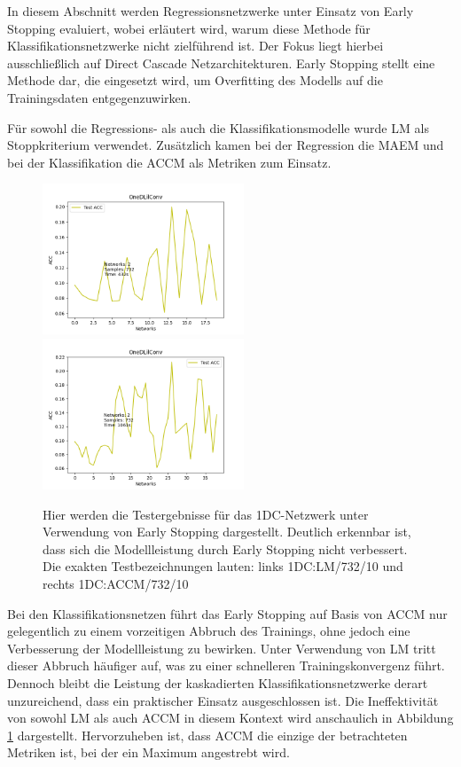 In diesem Abschnitt werden Regressionsnetzwerke unter Einsatz von Early Stopping evaluiert, wobei erläutert wird, warum diese Methode für 
Klassifikationsnetzwerke nicht zielführend ist. Der Fokus liegt hierbei ausschließlich auf Direct Cascade Netzarchitekturen. 
Early Stopping stellt eine Methode dar, die eingesetzt wird, um Overfitting des Modells auf die Trainingsdaten entgegenzuwirken.

Für sowohl die Regressions- als auch die Klassifikationsmodelle wurde LM als Stoppkriterium verwendet. Zusätzlich kamen bei der 
Regression die MAEM und bei der Klassifikation die ACCM als Metriken zum Einsatz.

\begin{figure}[htpb]
    \includegraphics[height=4.5cm]{../../Plots/ba_plots/earlystopping/lossmetric/1dconv_ts.png}
    \includegraphics[height=4.5cm]{../../Plots/ba_plots/earlystopping/intermetric/1dconv_ts.png}
    \caption{\label{fig:1dconvmetrics} 
    \small{Hier werden die Testergebnisse für das 1DC-Netzwerk unter Verwendung von Early Stopping dargestellt. Deutlich erkennbar ist, dass sich 
    die Modellleistung durch Early Stopping nicht verbessert. Die exakten Testbezeichnungen lauten: links 1DC:LM/732/10 und rechts 1DC:ACCM/732/10}}
\end{figure}

Bei den Klassifikationsnetzen führt das Early Stopping auf Basis von ACCM nur gelegentlich zu einem vorzeitigen Abbruch des Trainings, ohne 
jedoch eine Verbesserung der Modellleistung zu bewirken. Unter Verwendung von LM tritt dieser Abbruch häufiger auf, was zu einer schnelleren 
Trainingskonvergenz führt. Dennoch bleibt die Leistung der kaskadierten Klassifikationsnetzwerke derart unzureichend, dass ein praktischer 
Einsatz ausgeschlossen ist. Die Ineffektivität von sowohl LM als auch ACCM in diesem Kontext wird anschaulich in 
Abbildung \ref{fig:1dconvmetrics} dargestellt. Hervorzuheben ist, dass ACCM die einzige der betrachteten Metriken ist, bei der ein Maximum 
angestrebt wird.

